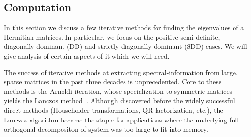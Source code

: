 \documentclass[10pt]{article}
\newcommand{\+}{%
	\raisebox{0.18ex}{\scaleobj{0.55}{+}}
}
\begin{document}

\subsection*{Computation}
In this section we discuss a few iterative methods for finding the eigenvalues of a Hermitian matrices. In particular, we focus on the positive semi-definite, diagonally dominant (DD) and strictly diagonally dominant (SDD) cases. We will give analysis of certain aspects of it which we will need.

The success of iterative methods at extracting spectral-information from large, sparse matrices in the past three decades is unprecedented. Core to these methods is the Arnoldi iteration, whose specialization to symmetric matrices yields the Lanczos method~\cite{}. Although discovered before the widely successful direct methods (Householder transformations, QR factorization, etc.), the Lanczos algorithm became the staple for applications where the underlying full orthogonal decompositon of system was too large to fit into memory. 
 
\end{document}
